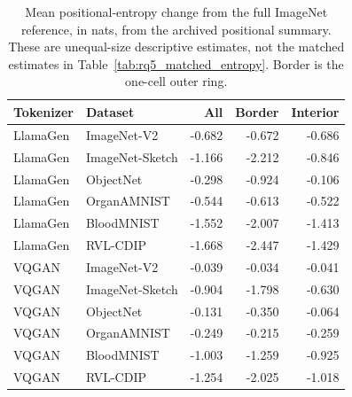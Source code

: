 \begin{table}[htbp]
\centering
\small
\begin{tabular}{llrrr}
Tokenizer & Dataset & All & Border & Interior \\ \hline
LlamaGen & ImageNet-V2 & -0.682 & -0.672 & -0.686 \\
LlamaGen & ImageNet-Sketch & -1.166 & -2.212 & -0.846 \\
LlamaGen & ObjectNet & -0.298 & -0.924 & -0.106 \\
LlamaGen & OrganAMNIST & -0.544 & -0.613 & -0.522 \\
LlamaGen & BloodMNIST & -1.552 & -2.007 & -1.413 \\
LlamaGen & RVL-CDIP & -1.668 & -2.447 & -1.429 \\ \hline
VQGAN & ImageNet-V2 & -0.039 & -0.034 & -0.041 \\
VQGAN & ImageNet-Sketch & -0.904 & -1.798 & -0.630 \\
VQGAN & ObjectNet & -0.131 & -0.350 & -0.064 \\
VQGAN & OrganAMNIST & -0.249 & -0.215 & -0.259 \\
VQGAN & BloodMNIST & -1.003 & -1.259 & -0.925 \\
VQGAN & RVL-CDIP & -1.254 & -2.025 & -1.018 \\
\end{tabular}
\caption{Mean positional-entropy change from the full ImageNet reference,
in nats, from the archived positional summary. These are unequal-size
descriptive estimates, not the matched estimates in
Table~\ref{tab:rq5_matched_entropy}. Border is the one-cell outer ring.}
\label{tab:app_positional_entropy}
\end{table}
